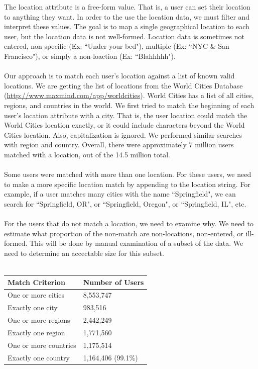 \noindent The location attribute is a free-form value.  That is, a user can set their location to anything they want.  In order to the use the location data, we must filter and interpret these values.  The goal is to map a single geographical location to each user, but the location data is not well-formed.  Location data is sometimes not entered, non-specific (Ex: ``Under your bed"), multiple (Ex: ``NYC \& San Francisco"), or simply a non-loaction (Ex: ``Blahhhhh").\\\\
Our approach is to match each user's location against a list of known valid locations.  We are getting the list of locations from the World Cities Database (\url{http://www.maxmind.com/app/worldcities}).  World Cities has a list of all cities, regions, and countries in the world.  We first tried to match the beginning of each user's location attribute with a city.  That is, the user location could match the World Cities location exactly, or it could include characters beyond the World Cities location.  Also, capitalization is ignored.  We performed similar searches with region and country.  Overall, there were approximately 7 million users matched with a location, out of the 14.5 million total.\\\\
Some users were matched with more than one location.  For these users, we need to make a more specific location match by appending to the location string.  For example, if a user matches many cities with the name ``Springfield", we can search for ``Springfield, OR", or ``Springfield, Oregon", or ``Springfield, IL", etc.\\\\
For the users that do not match a location, we need to examine why.  We need to estimate what proportion of the non-match are non-locations, non-entered, or ill-formed.  This will be done by manual examination of a subset of the data.  We need to determine an accectable size for this subset.\\\\ 
\begin{tabular}{| l | l |}
\hline
\textbf{Match Criterion} & \textbf{Number of Users} \\ \hline
One or more cities & 8,553,747 \\ \hline
Exactly one city & 983,516 \\ \hline
One or more regions & 2,442,249 \\ \hline
Exactly one region & 1,771,560\\ \hline
One or more countries & 1,175,514 \\ \hline
Exactly one country & 1,164,406 (99.1\%) \\ \hline
\end{tabular}\\\\

